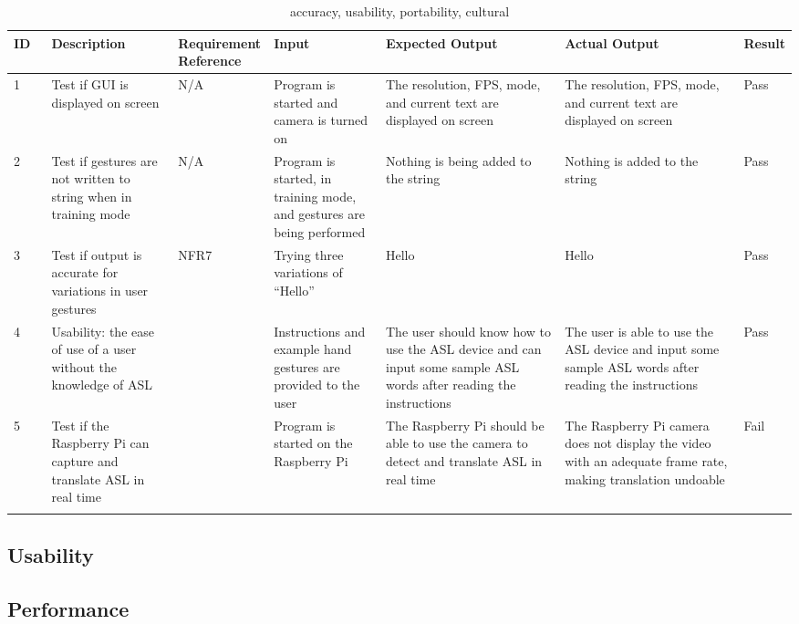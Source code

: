 \documentclass[12pt, titlepage]{article}
\begin{document}
\begin{landscape}
\renewcommand{\arraystretch}{1.2}
\noindent \begin{longtable}{p{0.05\linewidth}|p{0.17\linewidth}|p{0.1\linewidth}|p{0.15\linewidth}|p{0.25\linewidth}|p{0.25\linewidth}|p{0.05\linewidth}}
\hline
\textbf{ID} & \textbf{Description} & \textbf{Requirement Reference} & \textbf{Input} & \textbf{Expected Output} & \textbf{Actual Output} & \textbf{Result}\\
\hline
1 & Test if GUI is displayed on screen & N/A & Program is started and camera is turned on & The resolution, FPS, mode, and current text are displayed on screen & The resolution, FPS, mode, and current text are displayed on screen & Pass\\ \hline
2 & Test if gestures are not written to string when in training mode & N/A & Program is started, in training mode, and gestures are being performed & Nothing is being added to the string & Nothing is added to the string & Pass\\ \hline
3 & Test if output is accurate for variations in user gestures & NFR7 & Trying three variations of “Hello” & Hello & Hello & Pass\\ \hline
4 & Usability: the ease of use of a user without the knowledge of ASL &  & Instructions and example hand gestures are provided to the user & The user should know how to use the ASL device and can input some sample ASL words after reading the instructions & The user is able to use the ASL device and input some sample ASL words after reading the instructions & Pass\\ \hline
5 & Test if the Raspberry Pi can capture and translate ASL in real time &  & Program is started on the Raspberry Pi & The Raspberry Pi should be able to use the camera to detect and translate ASL in real time & The Raspberry Pi camera does not display the video with an adequate frame rate, making translation undoable & Fail\\
\hline
\caption{accuracy, usability, portability, cultural}
\end{longtable}
\end{landscape}

\subsection{Usability}
		
\subsection{Performance}
\end{document}

